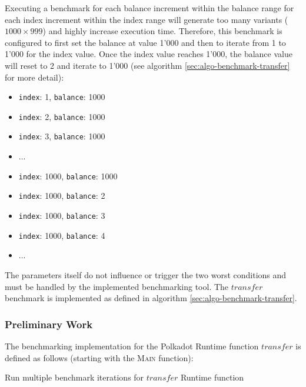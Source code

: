 \documentclass[11pt,a4paper]{article}
\begin{document}
Executing a benchmark for each balance increment within the balance range for
each index increment within the index range will generate too many variants
($1000 \times 999$) and highly increase execution time. Therefore, this
benchmark is configured to first set the balance at value 1'000 and then to
iterate from 1 to 1'000 for the index value. Once the index value reaches 1'000,
the balance value will reset to 2 and iterate to 1'000 (see algorithm
\ref{sec:algo-benchmark-transfer} for more detail):

\begin{itemize}
  \item \verb|index|: 1, \verb|balance|: 1000
  \item \verb|index|: 2, \verb|balance|: 1000
  \item \verb|index|: 3, \verb|balance|: 1000
  \item ...
  \item \verb|index|: 1000, \verb|balance|: 1000
  \item \verb|index|: 1000, \verb|balance|: 2
  \item \verb|index|: 1000, \verb|balance|: 3
  \item \verb|index|: 1000, \verb|balance|: 4
  \item ...
\end{itemize}

The parameters itself do not influence or trigger the two worst conditions and
must be handled by the implemented benchmarking tool. The $transfer$ benchmark
is implemented as defined in algorithm \ref{sec:algo-benchmark-transfer}.

\subsubsection{Preliminary Work}

The benchmarking implementation for the Polkadot Runtime function $transfer$ is
defined as follows (starting with the \textsc{Main} function):
\newline

\begin{algorithm}[H]\label{sec:algo-benchmark-transfer}
  \caption{Run multiple benchmark iterations for $transfer$ Runtime function}
  \SetAlgoLined {} \BlankLine {} \BlankLine {}
\end{algorithm}
\end{document}
